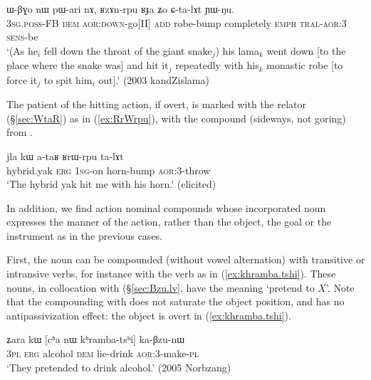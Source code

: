 \begin{exe}
\ex \label{ex:RzAnrpu}
 \gll ɯ-βɣo nɯ pɯ-ari nɤ, ʁzɤn-rpu ʁɟa ʑo ɕ-ta-lɤt ɲɯ-ŋu. \\
 \textsc{3sg}.\textsc{poss}-FB \textsc{dem} \textsc{aor}:\textsc{down}-go[II] \textsc{add} robe-bump completely \textsc{emph} \textsc{tral}-\textsc{aor}:3\flobv{} \textsc{sens}-be \\
\glt `(As he$_i$ fell down the throat of the giant snake$_j$) his lama$_k$ went down [to the place where the snake was] and hit it$_j$ repeatedly with his$_k$  monastic robe [to force it$_j$ to spit him$_i$ out].' (2003 kandZislama)
\end{exe}

The patient of the hitting action, if overt, is marked with the relator   (§\ref{sec:WtaR}) as in (\ref{ex:RrWrpu}), with the compound  (sideways, not goring) from .

\begin{exe}
\ex \label{ex:RrWrpu}
 \gll jla kɯ a-taʁ ʁrɯ-rpu ta-lɤt \\
 hybrid.yak \textsc{erg} \textsc{1sg}-on  horn-bump \textsc{aor}:3\flobv{}-throw \\
 \glt `The hybrid yak hit me with his horn.' (elicited)
\end{exe}
 
In addition, we find action nominal compounds whose incorporated noun expresses the manner of the action, rather than the object, the goal or the instrument as in the previous cases. 

First, the noun  can be compounded (without vowel alternation) with transitive or intransive verbs, for instance with the verb  as  in (\ref{ex:khramba.tshi}). These nouns, in collocation with  (§\ref{sec:Bzu.lv}, have the meaning `pretend to $X$'. Note that the compounding with  does not saturate the object position, and has no antipassivization effect: the object  is overt in (\ref{ex:khramba.tshi}).

\begin{exe}
\ex \label{ex:khramba.tshi}
\gll ʑara kɯ [cʰa nɯ kʰramba-tsʰi] ka-βzu-nɯ \\
\textsc{3pl} \textsc{erg} alcohol \textsc{dem} lie-drink \textsc{aor}:3\flobv{}-make-\textsc{pl} \\
\glt `They pretended to drink alcohol.' (2005 Norbzang)
\end{exe}

